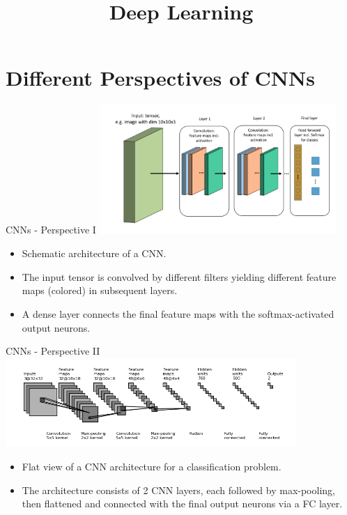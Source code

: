 




\newcommand{\titlefigure}{figure/alexnet.png}
\newcommand{\learninggoals}{
  \item Architecture
}

\title{Deep Learning}
\date{}




\section{Different Perspectives of CNNs}
\begin{vbframe}{CNNs - Perspective I}
\center
\includegraphics[width=9cm]{figure/cnn_scheme.png}
\begin{itemize}
\item Schematic architecture of a CNN.
\item The input tensor is convolved by different filters yielding different feature maps (colored) in subsequent layers.
\item A dense layer connects the final feature maps with the softmax-activated output neurons.
\end{itemize}
\end{vbframe}

\begin{vbframe}{CNNs - Perspective II}
\center
\includegraphics[width=11cm]{figure/cnn_flat.png}
\begin{itemize}
\item Flat view of a CNN architecture for a classification problem.
\item The architecture consists of 2 CNN layers, each followed by max-pooling, then flattened and connected with the final output neurons via a FC layer.
\end{itemize}
\end{vbframe}

